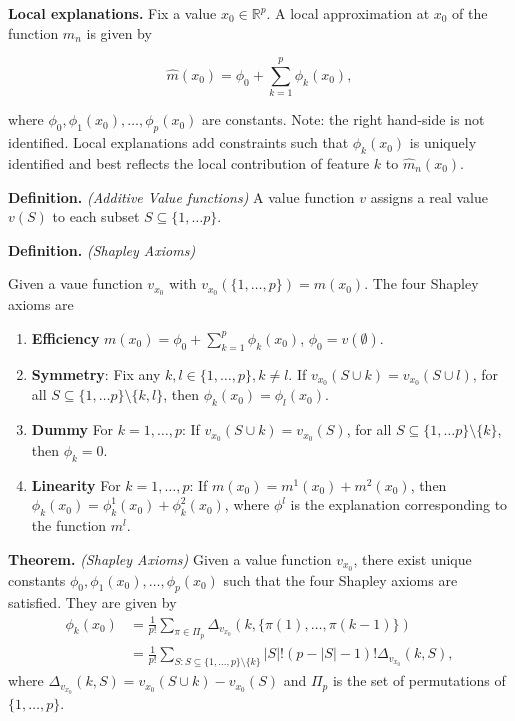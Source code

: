 \documentclass[
]{book}
\providecommand{\tightlist}{%
  \setlength{\itemsep}{0pt}\setlength{\parskip}{0pt}}
\begin{document}
\textbf{Local explanations.} Fix a value \(x_0 \in \mathbb R^p\). A local approximation at \(x_0\) of the function \(\hat m_n\) is given by

\[
\hat m\left(x_0\right)=\phi_{0}+\sum_{k=1}^{p} \phi_k(x_0),
\]

where \(\phi_0,\phi_1(x_0),\dots,\phi_p(x_0)\) are constants. Note: the right hand-side is not identified. Local explanations add constraints such that \(\phi_k(x_0)\) is uniquely identified and best reflects the local contribution of feature \(k\) to \(\hat m_n\left(x_0\right)\).

\textbf{Definition.} \emph{(Additive Value functions)} A value function \(v\) assigns a real value
\(v(S)\) to each subset \(S \subseteq \{1,\dots p\}\).

\textbf{Definition.} \emph{(Shapley Axioms)}

Given a vaue function \(v_{x_0}\) with \(v_{x_0}(\{1,\dots,p\})=m(x_0)\). The four Shapley axioms are

\begin{enumerate}
\def\labelenumi{\arabic{enumi}.}
\tightlist
\item
  \textbf{Efficiency} \(m\left(x_0\right)=\phi_{0}+\sum_{k=1}^{p} \phi_k(x_0)\), \(\phi_{0}=v(\emptyset)\).
\item
  \textbf{Symmetry}: Fix any \(k,l \in \{1,\dots,p\}, k\neq l\).
  If \(v_{x_0}(S\cup k)=v_{x_0}(S\cup l)\), for all \(S \subseteq \{1,\dots p\}\setminus \{k,l\}\), then \(\phi_k(x_0)=\phi_l(x_0).\)
\item
  \textbf{Dummy} For \(k=1,\dots,p\): If \(v_{x_0}(S\cup k)=v_{x_0}(S)\), for all \(S \subseteq \{1,\dots p\}\setminus \{k\}\), then \(\phi_k=0.\)
\item
  \textbf{Linearity} For \(k=1,\dots,p\): If \(m(x_0)=m^1(x_0)+m^2(x_0)\), then \(\phi_k(x_0)=\phi^1_k(x_0)+\phi^2_k(x_0)\), where \(\phi^l\) is the explanation corresponding to the function \(m^l\).
\end{enumerate}

\textbf{Theorem.} \emph{(Shapley Axioms)} Given a value function \(v_{x_0}\), there exist unique constants \(\phi_0,\phi_1(x_0),\dots,\phi_p(x_0)\) such that the four Shapley axioms are satisfied. They are given by
\begin{align}
\phi_{k}(x_0)&=\frac{1}{p !} \sum_{\pi \in \Pi_p} \Delta_{v_{x_0}}\left(k, \{\pi(1),\dots,\pi(k-1)\}\right)\\
&=\frac 1 {p!}\sum_{S: S \subseteq \{1,\dots,p\} \setminus\{k\}} {|S| !(p -|S|-1) !}\Delta_{v_{x_0}}(k, S),
\end{align}
where \(\Delta_{v_{x_0}}(k, S)=v_{x_0}(S \cup k)-v_{x_0}(S)\) and \(\Pi_p\) is the set of permutations of \(\{1,\dots,p\}\).
\end{document}
